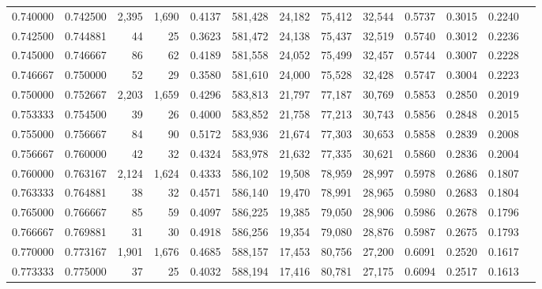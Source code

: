 \begin{tabular}{rrrrrrrrrrrrr}
0.740000 & 0.742500 &  2,395 & 1,690 &                                     0.4137 & 581,428 &  24,182 &  75,412 &  32,544 & 0.5737 & 0.3015 & 0.2240 \\
0.742500 & 0.744881 &     44 &    25 &                                     0.3623 & 581,472 &  24,138 &  75,437 &  32,519 & 0.5740 & 0.3012 & 0.2236 \\
0.745000 & 0.746667 &     86 &    62 &                                     0.4189 & 581,558 &  24,052 &  75,499 &  32,457 & 0.5744 & 0.3007 & 0.2228 \\
0.746667 & 0.750000 &     52 &    29 &                                     0.3580 & 581,610 &  24,000 &  75,528 &  32,428 & 0.5747 & 0.3004 & 0.2223 \\
0.750000 & 0.752667 &  2,203 & 1,659 &                                     0.4296 & 583,813 &  21,797 &  77,187 &  30,769 & 0.5853 & 0.2850 & 0.2019 \\
0.753333 & 0.754500 &     39 &    26 &                                     0.4000 & 583,852 &  21,758 &  77,213 &  30,743 & 0.5856 & 0.2848 & 0.2015 \\
0.755000 & 0.756667 &     84 &    90 &                                     0.5172 & 583,936 &  21,674 &  77,303 &  30,653 & 0.5858 & 0.2839 & 0.2008 \\
0.756667 & 0.760000 &     42 &    32 &                                     0.4324 & 583,978 &  21,632 &  77,335 &  30,621 & 0.5860 & 0.2836 & 0.2004 \\
0.760000 & 0.763167 &  2,124 & 1,624 &                                     0.4333 & 586,102 &  19,508 &  78,959 &  28,997 & 0.5978 & 0.2686 & 0.1807 \\
0.763333 & 0.764881 &     38 &    32 &                                     0.4571 & 586,140 &  19,470 &  78,991 &  28,965 & 0.5980 & 0.2683 & 0.1804 \\
0.765000 & 0.766667 &     85 &    59 &                                     0.4097 & 586,225 &  19,385 &  79,050 &  28,906 & 0.5986 & 0.2678 & 0.1796 \\
0.766667 & 0.769881 &     31 &    30 &                                     0.4918 & 586,256 &  19,354 &  79,080 &  28,876 & 0.5987 & 0.2675 & 0.1793 \\
0.770000 & 0.773167 &  1,901 & 1,676 &                                     0.4685 & 588,157 &  17,453 &  80,756 &  27,200 & 0.6091 & 0.2520 & 0.1617 \\
0.773333 & 0.775000 &     37 &    25 &                                     0.4032 & 588,194 &  17,416 &  80,781 &  27,175 & 0.6094 & 0.2517 & 0.1613 \\

\end{tabular}
